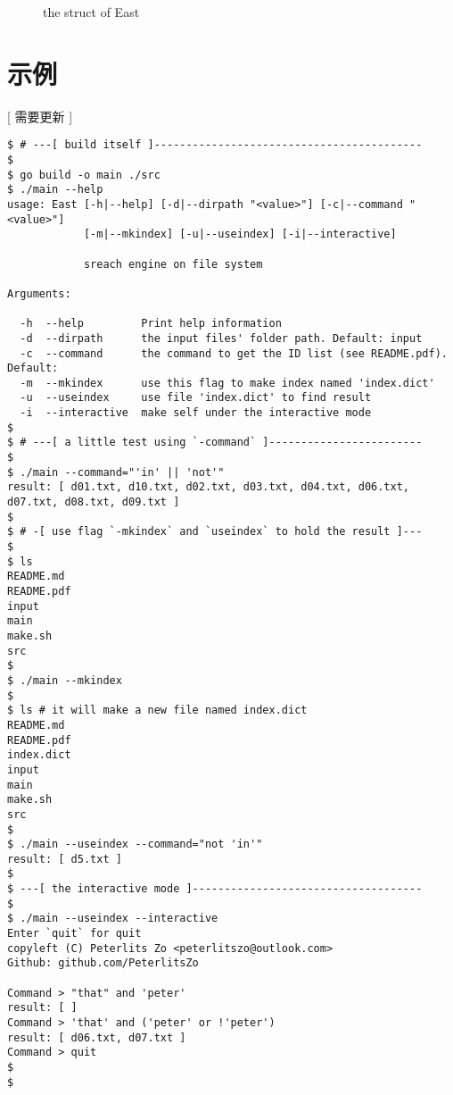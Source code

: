 \documentclass{peterlitsdoc}
\begin{document}
\begin{figure}[H]
{
}
\caption{the struct of East}
\label{struct}
\end{figure}


\section{示例}

[ 需要更新 ]

\begin{lstlisting}
$ # ---[ build itself ]------------------------------------------
$
$ go build -o main ./src
$ ./main --help
usage: East [-h|--help] [-d|--dirpath "<value>"] [-c|--command "<value>"]
            [-m|--mkindex] [-u|--useindex] [-i|--interactive]

            sreach engine on file system

Arguments:

  -h  --help         Print help information
  -d  --dirpath      the input files' folder path. Default: input
  -c  --command      the command to get the ID list (see README.pdf). Default: 
  -m  --mkindex      use this flag to make index named 'index.dict'
  -u  --useindex     use file 'index.dict' to find result
  -i  --interactive  make self under the interactive mode
$
$ # ---[ a little test using `-command` ]------------------------
$
$ ./main --command="'in' || 'not'"
result: [ d01.txt, d10.txt, d02.txt, d03.txt, d04.txt, d06.txt, d07.txt, d08.txt, d09.txt ]
$
$ # -[ use flag `-mkindex` and `useindex` to hold the result ]---
$
$ ls
README.md
README.pdf
input
main
make.sh
src
$
$ ./main --mkindex
$
$ ls # it will make a new file named index.dict
README.md
README.pdf
index.dict
input
main
make.sh
src
$
$ ./main --useindex --command="not 'in'"
result: [ d5.txt ]
$
$ ---[ the interactive mode ]------------------------------------
$
$ ./main --useindex --interactive
Enter `quit` for quit
copyleft (C) Peterlits Zo <peterlitszo@outlook.com>
Github: github.com/PeterlitsZo

Command > "that" and 'peter'
result: [ ]
Command > 'that' and ('peter' or !'peter')
result: [ d06.txt, d07.txt ]
Command > quit
$ 
$ 
\end{lstlisting}
\end{document}
